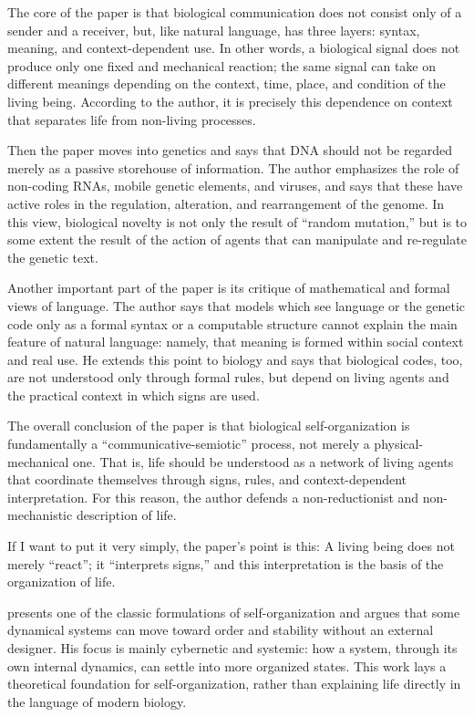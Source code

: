 \documentclass{book}
\begin{document}
    The core of the paper is that biological communication does not consist only of a sender and a receiver, but, like natural language, has three layers: syntax, meaning, and context-dependent use. In other words, a biological signal does not produce only one fixed and mechanical reaction; the same signal can take on different meanings depending on the context, time, place, and condition of the living being. According to the author, it is precisely this dependence on context that separates life from non-living processes.
    
    Then the paper moves into genetics and says that DNA should not be regarded merely as a passive storehouse of information. The author emphasizes the role of non-coding RNAs, mobile genetic elements, and viruses, and says that these have active roles in the regulation, alteration, and rearrangement of the genome. In this view, biological novelty is not only the result of “random mutation,” but is to some extent the result of the action of agents that can manipulate and re-regulate the genetic text.
    
    Another important part of the paper is its critique of mathematical and formal views of language. The author says that models which see language or the genetic code only as a formal syntax or a computable structure cannot explain the main feature of natural language: namely, that meaning is formed within social context and real use. He extends this point to biology and says that biological codes, too, are not understood only through formal rules, but depend on living agents and the practical context in which signs are used.
    
    The overall conclusion of the paper is that biological self-organization is fundamentally a “communicative-semiotic” process, not merely a physical-mechanical one. That is, life should be understood as a network of living agents that coordinate themselves through signs, rules, and context-dependent interpretation. For this reason, the author defends a non-reductionist and non-mechanistic description of life.
    
    If I want to put it very simply, the paper’s point is this:
    A living being does not merely “react”; it “interprets signs,” and this interpretation is the basis of the organization of life.


\cite{ashby-1947-principles-of-the-self-organizing-dynamic-system} presents one of the classic formulations of self-organization and argues that some dynamical systems can move toward order and stability without an external designer.
    His focus is mainly cybernetic and systemic: how a system, through its own internal dynamics, can settle into more organized states.
    This work lays a theoretical foundation for self-organization, rather than explaining life directly in the language of modern biology.
    
\end{document}
